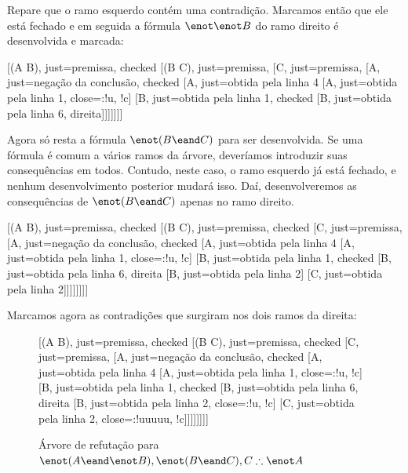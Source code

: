 Repare que o ramo esquerdo contém uma contradição. Marcamos então que ele está fechado e em seguida a fórmula $\enot \enot B$ do ramo direito é desenvolvida e marcada:
\begin{center}
	\begin{tableau}
		{
		}
		[\enot(A \eand \enot B), just=premissa, checked
		[\enot(B \eand C), just=premissa, 
		[C, just=premissa, 
		[\enot \enot A, just={negação da conclusão}, checked
		[A, just={obtida pela linha 4}
			[\enot A, just={obtida pela linha 1}, close={:!u, !c}]
			[\enot \enot B, just={obtida pela linha 1}, checked
			[B, just={obtida pela linha 6, direita}]]]]]]]
	\end{tableau}
\end{center}

Agora só resta a fórmula $\enot(B \eand C)$ para ser desenvolvida. 
Se uma fórmula é comum a vários ramos da árvore, deveríamos introduzir suas consequências em todos. Contudo, neste caso, o ramo esquerdo já está fechado, e nenhum desenvolvimento posterior mudará isso.
Daí, desenvolveremos as consequências de $\enot(B \eand C)$ apenas no ramo direito.

\begin{center}
	\begin{tableau}
		{
		}
		[\enot(A \eand \enot B), just=premissa, checked
		[\enot(B \eand C), just=premissa, checked
		[C, just=premissa, 
		[\enot \enot A, just={negação da conclusão}, checked
		[A, just={obtida pela linha 4}
			[\enot A, just={obtida pela linha 1}, close={:!u, !c}]
			[\enot \enot B, just={obtida pela linha 1}, checked
			[B, just={obtida pela linha 6, direita}			
				[\enot B, just={obtida pela linha 2}]
				[\enot C, just={obtida pela linha 2}]]]]]]]]
	\end{tableau}
\end{center}

Marcamos agora as contradições que surgiram nos dois ramos da direita:

\begin{figure}[h!]
\begin{center}
	\begin{tableau}
		{
		}
		[\enot(A \eand \enot B), just=premissa, checked
		[\enot(B \eand C), just=premissa, checked
		[C, just=premissa, 
		[\enot \enot A, just={negação da conclusão}, checked
		[A, just={obtida pela linha 4}
			[\enot A, just={obtida pela linha 1}, close={:!u, !c}]
			[\enot \enot B, just={obtida pela linha 1}, checked
			[B, just={obtida pela linha 6, direita}			
				[\enot B, just={obtida pela linha 2}, close={:!u, !c}]
				[\enot C, just={obtida pela linha 2}, close={:!uuuuu, !c}]]]]]]]]
	\end{tableau}
\end{center}
	\caption{Árvore de refutação para  $\enot(A \eand \enot B), \enot(B \eand C), C \therefore \enot A$}
	\label{truth.trees.ex.2}
\end{figure}

